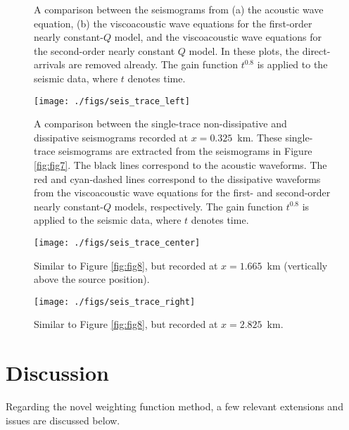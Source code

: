 \documentclass[article]{./macros/elsarticle_qh}
\begin{document}
\begin{figure}[H]
\centering
{}
\quad
{}
\quad
{}
\caption{
A comparison between the seismograms from (a) the acoustic wave equation, (b) the viscoacoustic wave equations for the first-order nearly constant-$Q$ model, and the viscoacoustic wave equations for the second-order nearly constant $Q$ model. In these plots, the direct-arrivals are removed already. The gain function $t^{0.8}$ is applied to the seismic data, where $t$ denotes time.  
}
\label{fig:fig11}
\end{figure}

\begin{figure}[H]
\centering
\texttt{[image: ./figs/seis\_trace\_left]}
\caption{
A comparison between the single-trace non-dissipative and dissipative seismograms recorded at $x=0.325$~km. These single-trace seismograms are extracted from the seismograms in Figure \ref{fig:fig7}. 
The black lines correspond to the acoustic waveforms. The red and cyan-dashed lines correspond to the dissipative waveforms from the viscoacoustic wave equations for the first- and second-order nearly constant-$Q$ models, respectively. The gain function $t^{0.8}$ is applied to the seismic data, where $t$ denotes time.
}
\label{fig:fig12}
\end{figure}

\begin{figure}[H]
\centering
\texttt{[image: ./figs/seis\_trace\_center]}
\caption{
Similar to Figure \ref{fig:fig8}, but recorded at $x=1.665$~km (vertically above the source position). 
}
\label{fig:fig13}
\end{figure}

\begin{figure}[H]
\centering
\texttt{[image: ./figs/seis\_trace\_right]}
\caption{
Similar to Figure \ref{fig:fig8}, but recorded at $x=2.825$~km. 
}
\label{fig:fig14}
\end{figure}

\section{Discussion}
Regarding the novel weighting function method, a few relevant extensions and issues are discussed below.
\end{document}
